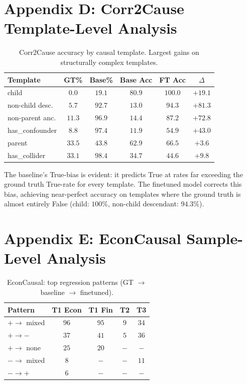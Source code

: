 \documentclass[sigconf]{acmart}
\begin{document}
\section{Appendix D: Corr2Cause Template-Level Analysis}

\begin{table}
\caption{Corr2Cause accuracy by causal template. Largest gains on structurally complex templates.}
\label{tab:corr2cause_templates}
\begin{tabular}{lccccc}
\toprule
Template & GT\% & Base\% & Base Acc & FT Acc & $\Delta$ \\
\midrule
child & $0.0$ & $19.1$ & $80.9$ & $100.0$ & $+19.1$ \\
non-child desc. & $5.7$ & $92.7$ & $13.0$ & $94.3$ & $+81.3$ \\
non-parent anc. & $11.3$ & $96.9$ & $14.4$ & $87.2$ & $+72.8$ \\
has\_confounder & $8.8$ & $97.4$ & $11.9$ & $54.9$ & $+43.0$ \\
parent & $33.5$ & $43.8$ & $62.9$ & $66.5$ & $+3.6$ \\
has\_collider & $33.1$ & $98.4$ & $34.7$ & $44.6$ & $+9.8$ \\
\bottomrule
\end{tabular}
\end{table}

The baseline's True-bias is evident: it predicts True at rates far exceeding the ground truth True-rate for every template. The finetuned model corrects this bias, achieving near-perfect accuracy on templates where the ground truth is almost entirely False (child: $100\%$, non-child descendant: $94.3\%$).

\section{Appendix E: EconCausal Sample-Level Analysis}

\begin{table}
\caption{EconCausal: top regression patterns (GT $\rightarrow$ baseline $\rightarrow$ finetuned).}
\label{tab:econcausal_patterns}
\begin{tabular}{lcccc}
\toprule
Pattern & T1 Econ & T1 Fin & T2 & T3 \\
\midrule
$+ \rightarrow$ mixed & $96$ & $95$ & $9$ & $34$ \\
$+ \rightarrow -$ & $37$ & $41$ & $5$ & $36$ \\
$+ \rightarrow$ none & $25$ & $20$ & $-$ & $-$ \\
$- \rightarrow$ mixed & $8$ & $-$ & $-$ & $11$ \\
$- \rightarrow +$ & $6$ & $-$ & $-$ & $-$ \\
\bottomrule
\end{tabular}
\end{table}
\end{document}

